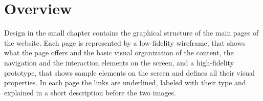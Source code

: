 \documentclass[../../DD.tex]{subfiles}
\begin{document}
\section{Overview}
	Design in the small chapter contains the graphical structure of the main pages of the website. Each page is represented by a low-fidelity wireframe, that shows what the page offers and the basic visual organization of the content, the navigation and the interaction elements on the screen, and a high-fidelity prototype, that shows sample elements on the screen and defines all their visual properties. In each page the links are underlined, labeled with their type and explained in a short description before the two images.
\end{document}
